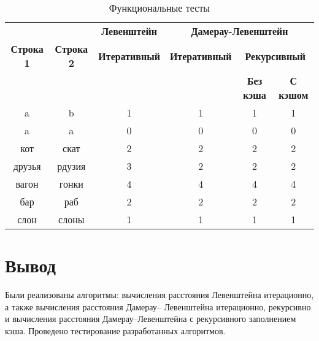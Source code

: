 \begin{table}[ht]
	\small
	\begin{center}
		\caption{Функциональные тесты}
		\label{tbl:func_tests}
		\begin{tabular}{|c|c|c|c|c|c|}
			\hline
			&
			& \multicolumn{1}{c|}{\bfseries Левенштейн}
			& \multicolumn{3}{c|}{\bfseries Дамерау-Левенштейн} \\ \cline{3-6}
			
			\bfseries Строка 1 & \bfseries Строка 2 & \bfseries Итеративный & \bfseries Итеративный
			
			& \multicolumn{2}{c|}{\bfseries Рекурсивный} \\ \cline{5-6}
			& & & & \bfseries Без кэша & \bfseries С кэшом \\
			\hline
			a & b & 1 & 1 & 1 & 1 \\
			\hline
			a & a & 0 & 0 & 0 & 0 \\
			\hline
			кот & скат & 2 & 2 & 2 & 2 \\
			\hline
			друзья & рдузия & 3 & 2 & 2 & 2 \\
			\hline
			вагон & гонки & 4 & 4 & 4 & 4 \\
			\hline
			бар & раб & 2 & 2 & 2 & 2 \\
			\hline
			слон & слоны & 1 & 1 & 1 & 1 \\
			\hline
		\end{tabular}
	\end{center}
\end{table}

\section{Вывод}

Были реализованы алгоритмы: вычисления расстояния Левенштейна
итерационно, а также вычисления расстояния Дамерау–
Левенштейна итерационно, рекурсивно и вычисления расстояния Дамерау–Левенштейна с рекурсивного заполнением кэша. Проведено тестирование разработанных алгоритмов.
